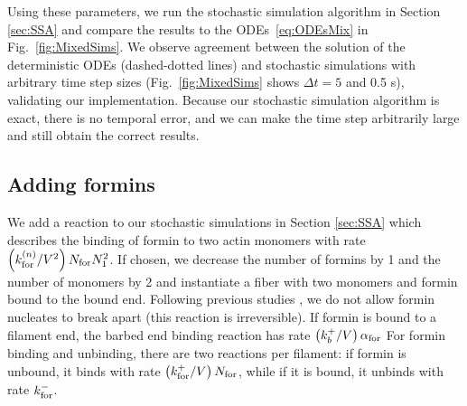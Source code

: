 \documentclass[11pt]{article}
\begin{document}
\begin{appendices}
Using these parameters, we run the stochastic simulation algorithm in Section \ref{sec:SSA} and compare the results to the ODEs\ \eqref{eq:ODEsMix} in Fig.\ \ref{fig:MixedSims}. We observe agreement between the solution of the deterministic ODEs (dashed-dotted lines) and stochastic simulations with arbitrary time step sizes (Fig.\ \ref{fig:MixedSims} shows $\Delta t=5$ and 0.5 s), validating our implementation. Because our stochastic simulation algorithm is exact, there is no temporal error, and we can make the time step arbitrarily large and still obtain the correct results.

\subsection{Adding formins}
We add a reaction to our stochastic simulations in Section \ref{sec:SSA} which describes the binding of formin to two actin monomers with rate $\left(k_\text{for}^{(n)}/V^2\right)N_\text{for}N_1^2 $. If chosen, we decrease the number of formins by 1 and the number of monomers by 2 and instantiate a fiber with two monomers and formin bound to the bound end. Following previous studies \cite{paul2008role, zweifel2021nucleation}, we do not allow formin nucleates to break apart (this reaction is irreversible). If formin is bound to a filament end, the barbed end binding reaction has rate $\left(k_b^+/V\right) \alpha_\text{for}$ For formin binding and unbinding, there are two reactions per filament: if formin is unbound, it binds with rate $\left(k_\text{for}^+/V\right) N_\text{for}$, while if it is bound, it unbinds with rate $k_\text{for}^-$. 


\end{appendices}
\end{document}
